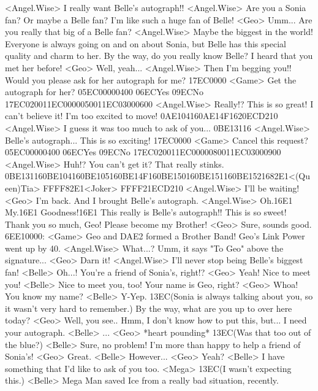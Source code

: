 <Angel.Wise> I really want Belle's autograph!! 
<Angel.Wise> Are you a Sonia fan? Or maybe a Belle fan? 
I'm like such a huge fan of Belle! 
<Geo> Umm... Are you really that big of a Belle fan? 
<Angel.Wise> Maybe the biggest in the world! 
Everyone is always going on and on about Sonia, but Belle 
has this special quality and charm to her. 
By the way, do you really know Belle? I heard that you met her before! 
<Geo> Well, yeah... 
<Angel.Wise> Then I'm begging you!! 
Would you please ask for her autograph for me? 
{17}{EC}{00}{00} 
<Game> Get the autograph for her? {05}{EC}{00}{00}{04}{00}  {06}{EC}Yes   {09}{EC}No 
{17}{EC}{02}{00}{11}{EC}{00}{00}{05}{00}{11}{EC}{03}{00}{06}{00}
<Angel.Wise> Really!? 
This is so great! I can't believe it! 
I'm too excited to move! 
{0A}{E1}{04}{16}{0A}{E1}{4F}{16}{20}{EC}{D2}{10}
<Angel.Wise> I guess it was too much to ask of you... 
{0B}{E1}{31}{16}
<Angel.Wise> Belle's autograph... This is so exciting! 
{17}{EC}{00}{00} 
<Game> Cancel this request? {05}{EC}{00}{00}{04}{00}  {06}{EC}Yes   {09}{EC}No 
{17}{EC}{02}{00}{11}{EC}{00}{00}{08}{00}{11}{EC}{03}{00}{09}{00}
<Angel.Wise> Huh!? You can't get it? That really stinks. 
{0B}{E1}{31}{16}{0B}{E1}{04}{16}{0B}{E1}{05}{16}{0B}{E1}{4F}{16}{0B}{E1}{50}{16}{0B}{E1}{51}{16}{0B}{E1}{52}{16}{82}{E1}<(Queen)Tia> {FF}{FF}{82}{E1}<Joker> {FF}{FF}{21}{EC}{D2}{10}
<Angel.Wise> I'll be waiting! 
<Geo> I'm back. 
And I brought Belle's autograph. 
<Angel.Wise> Oh.{16}{E1} My.{16}{E1} Goodness!{16}{E1} 
This really is Belle's autograph!! This is so sweet! 
Thank you so much, Geo! Please become my Brother! 
<Geo> Sure, sounds good. 
{6E}{E1}{00}{00}: 
<Game> Geo and {DA}{E2} formed a Brother Band! 
Geo's Link Power went up by 40. 
<Angel.Wise> What...? Umm, it says "To Geo" above the signature... 
<Geo> Darn it! 
<Angel.Wise> I'll never stop being Belle's biggest fan! 
<Belle> Oh...! 
You're a friend of Sonia's, right!? 
<Geo> Yeah! Nice to meet you! 
<Belle> Nice to meet you, too! Your name is Geo, right? 
<Geo> Whoa! You know my name? 
<Belle> Y-Yep. 
{13}{EC}(Sonia is always talking  about you, so it wasn't  very hard to remember.) 
By the way, what are you up to over here today? 
<Geo> Well, you see.. Hmm, I don't know how to put this, but... 
I need your autograph. 
<Belle> ... 
<Geo> *heart pounding* {13}{EC}(Was that too  out of the blue?) 
<Belle> Sure, no problem! 
I'm more than happy to help a friend of Sonia's! 
<Geo> Great. 
<Belle> However... 
<Geo> Yeah? 
<Belle> I have something that I'd like to ask of you too. 
<Mega> {13}{EC}(I wasn't expecting this.) 
<Belle> Mega Man saved Ice from a really bad situation, recently. 
